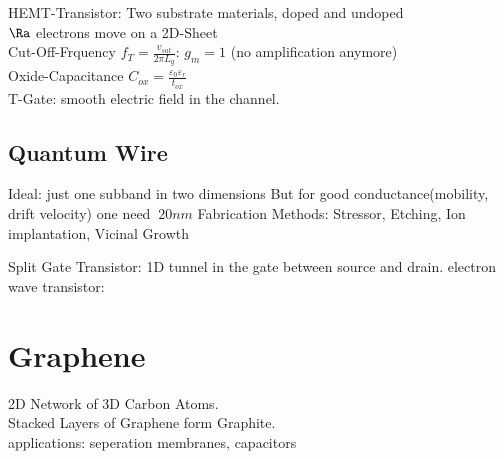 \documentclass[fs, footer]{latex4ei}
\begin{document}
\begin{multicols}{4}
	HEMT-Transistor: Two substrate materials, doped and undoped\\
	$\Ra$ electrons move on a 2D-Sheet\\
	Cut-Off-Frquency $f_T = \frac{v_{sat}}{2\pi L_g}$: $g_m = 1$ (no amplification anymore)\\
	Oxide-Capacitance $C_{ox} = \frac{\varepsilon_0 \varepsilon_r}{t_{ox}}$\\
	T-Gate: smooth electric field in the channel. 
	
	


	
	
	\subsection{Quantum Wire}
	Ideal: just one subband in two dimensions
	But for good conductance(mobility, drift velocity) one need $~20nm$
	Fabrication Methods: Stressor, Etching, Ion implantation, Vicinal Growth
	
	
	Split Gate Transistor: 1D tunnel in the gate between source and drain.
	electron wave transistor: 
	
	
\section{Graphene}
2D Network of 3D Carbon Atoms.\\
Stacked Layers of Graphene form Graphite.\\
applications: seperation membranes, capacitors
	
	\hspace{-0.2cm} \quad 
	

\end{multicols}
\end{document}

